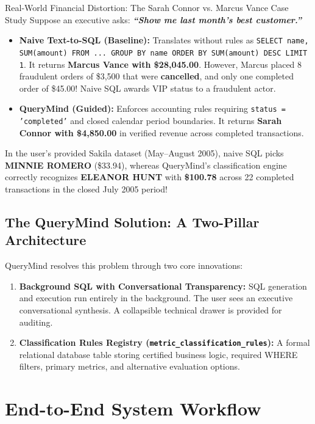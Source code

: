 \documentclass[10pt,a4paper]{article}
\begin{document}
\begin{alertbox}{Real-World Financial Distortion: The Sarah Connor vs. Marcus Vance Case Study}
Suppose an executive asks: \textbf{\textit{``Show me last month's best customer.''}}
\begin{itemize}
    \item \textbf{Naive Text-to-SQL (Baseline):} Translates without rules as \texttt{SELECT name, SUM(amount) FROM ... GROUP BY name ORDER BY SUM(amount) DESC LIMIT 1}. It returns \textbf{Marcus Vance with \$28,045.00}. However, Marcus placed 8 fraudulent orders of \$3,500 that were \textbf{cancelled}, and only one completed order of \$45.00! Naive SQL awards VIP status to a fraudulent actor.
    \item \textbf{QueryMind (Guided):} Enforces accounting rules requiring \texttt{status = 'completed'} and closed calendar period boundaries. It returns \textbf{Sarah Connor with \$4,850.00} in verified revenue across completed transactions.
\end{itemize}
In the user's provided Sakila dataset (May--August 2005), naive SQL picks \textbf{MINNIE ROMERO} (\$33.94), whereas QueryMind's classification engine correctly recognizes \textbf{ELEANOR HUNT} with \textbf{\$100.78} across 22 completed transactions in the closed July 2005 period!
\end{alertbox}

\subsection{The QueryMind Solution: A Two-Pillar Architecture}
QueryMind resolves this problem through two core innovations:
\begin{enumerate}
    \item \textbf{Background SQL with Conversational Transparency:} SQL generation and execution run entirely in the background. The user sees an executive conversational synthesis. A collapsible technical drawer is provided for auditing.
    \item \textbf{Classification Rules Registry (\texttt{metric\_classification\_rules}):} A formal relational database table storing certified business logic, required WHERE filters, primary metrics, and alternative evaluation options.
\end{enumerate}

\newpage
\section{End-to-End System Workflow}
\end{document}
